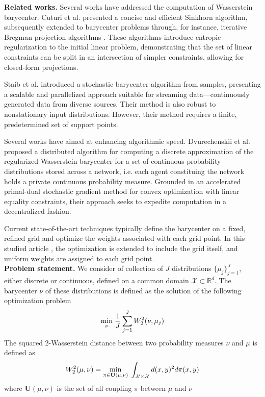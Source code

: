 \textbf{Related works.}  Several works have addressed the computation of Wasserstein barycenter. Cuturi et al. \cite{cuturi_sinkhorn_2013} presented a concise and efficient Sinkhorn algorithm, subsequently extended to barycenter problems through, for instance, iterative Bregman projection algorithms \cite{benamou_iterative_2014}. These algorithms introduce entropic regularization to the initial linear problem, demonstrating that the set of linear constraints can be split in an intersection of simpler constraints, allowing for closed-form projections.

Staib et al. \cite{staib_parallel_2017} introduced a stochastic barycenter algorithm from samples, presenting a scalable and parallelized approach suitable for streaming data—continuously generated data from diverse sources. Their method is also robust to nonstationary input distributions. However, their method requires a finite, predetermined set of support points. 

Several works have aimed at enhancing algorithmic speed. Dvurechenskii et al. \cite{dvurechenskii_decentralize_2018} proposed a distributed algorithm for computing a discrete approximation of the regularized Wasserstein barycenter for a set of continuous probability distributions stored across a network, i.e. each agent constituing the network holds a private continuous probability measure. Grounded in an accelerated primal-dual stochastic gradient method for convex optimization with linear equality constraints, their approach seeks to expedite computation in a decentralized fashion.

Current state-of-the-art techniques typically define the barycenter on a fixed, refined grid and optimize the weights associated with each grid point. In this studied article \cite{claici_stochastic_2018}, the optimization is extended to include the grid itself, and uniform weights are assigned to each grid point. \\ 

\textbf{Problem statement.} We consider of collection of $J$ distributions $\lbrace \mu_j \rbrace_{j=1}^J$, either discrete or continuous, defined on a common domain $\mathcal{X} \subset \mathbb{R}^d$. The barycenter $\nu$ of these distributions is defined as the solution of the following optimization problem 
$$ \underset{\nu}{\min}\;\frac{1}{J}\sum_{j=1}^{J} W_2^2(\nu, \mu_j) $$
The squared 2-Wasserstein distance between two probability measures $\nu$ and $\mu$ is defined as
\begin{equation}\label{eq:W2}
     W_2^2(\mu, \nu) = \underset{\pi \in \textbf{U}(\mu, \nu)}{\min}\; \int_{\mathcal{X}\times\mathcal{X}} d(x, y)^2 d\pi(x, y)
\end{equation}
where $\textbf{U}(\mu, \nu)$ is the set of all coupling $\pi$ between $\mu$ and $\nu$


